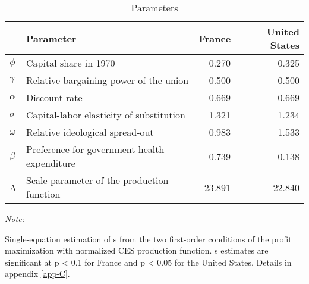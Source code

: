 \documentclass[
]{article}
\begin{document}
\begin{table}[t]

\caption{\label{tab:param}Parameters}
\centering
\begin{threeparttable}
\begin{tabular}{llrr}
\toprule
 & Parameter & France & United States\\
\midrule
$\phi$ & Capital share in 1970 & 0.270 & 0.325\\
$\gamma$ & Relative bargaining power of the union & 0.500 & 0.500\\
$\alpha$ & Discount rate & 0.669 & 0.669\\
$\sigma$ & Capital-labor elasticity of substitution & 1.321 & 1.234\\
$\omega$ & Relative ideological spread-out & 0.983 & 1.533\\
$\beta$ & Preference for government health expenditure & 0.739 & 0.138\\
A & Scale parameter of the production function & 23.891 & 22.840\\
\bottomrule
\end{tabular}
\begin{tablenotes}[para]
\item \textit{Note: } 
\item Single-equation estimation of s from the two first-order conditions of the profit maximization with normalized CES production function. s estimates are significant at p < 0.1 for France and p < 0.05 for the United States. Details in appendix \ref{app-C}.
\end{tablenotes}
\end{threeparttable}
\end{table}
\end{document}
